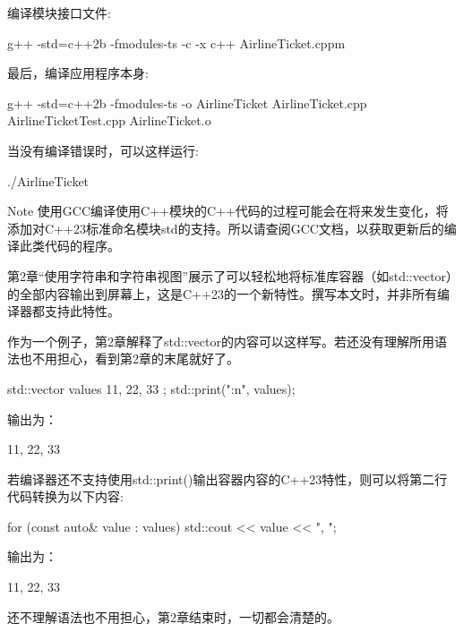 编译模块接口文件:

\begin{shell}
g++ -std=c++2b -fmodules-ts -c -x c++ AirlineTicket.cppm
\end{shell}

最后，编译应用程序本身:

\begin{shell}
g++ -std=c++2b -fmodules-ts -o AirlineTicket AirlineTicket.cpp AirlineTicketTest.cpp AirlineTicket.o
\end{shell}

当没有编译错误时，可以这样运行:

\begin{shell}
./AirlineTicket
\end{shell}

\begin{myNotic}{Note}
使用GCC编译使用C++模块的C++代码的过程可能会在将来发生变化，将添加对C++23标准命名模块std的支持。所以请查阅GCC文档，以获取更新后的编译此类代码的程序。
\end{myNotic}


第2章“使用字符串和字符串视图”展示了可以轻松地将标准库容器（如std::vector）的全部内容输出到屏幕上，这是C++23的一个新特性。撰写本文时，并非所有编译器都支持此特性。

作为一个例子，第2章解释了std::vector的内容可以这样写。若还没有理解所用语法也不用担心，看到第2章的末尾就好了。

\begin{cpp}
std::vector values { 11, 22, 33 };
std::print("{:n}", values);
\end{cpp}

输出为：

\begin{shell}
11, 22, 33
\end{shell}

若编译器还不支持使用std::print()输出容器内容的C++23特性，则可以将第二行代码转换为以下内容:

\begin{cpp}
for (const auto& value : values) { std::cout << value << ", "; }
\end{cpp}

输出为：

\begin{shell}
11, 22, 33
\end{shell}

还不理解语法也不用担心，第2章结束时，一切都会清楚的。


